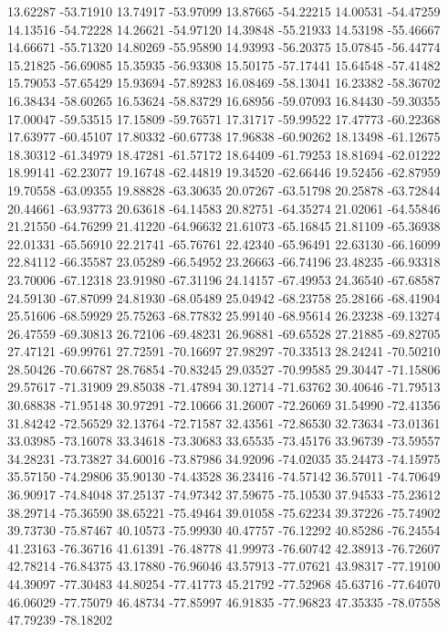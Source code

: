 {13.62287 -53.71910
13.74917 -53.97099
13.87665 -54.22215
14.00531 -54.47259
14.13516 -54.72228
14.26621 -54.97120
14.39848 -55.21933
14.53198 -55.46667
14.66671 -55.71320
14.80269 -55.95890
14.93993 -56.20375
15.07845 -56.44774
15.21825 -56.69085
15.35935 -56.93308
15.50175 -57.17441
15.64548 -57.41482
15.79053 -57.65429
15.93694 -57.89283
16.08469 -58.13041
16.23382 -58.36702
16.38434 -58.60265
16.53624 -58.83729
16.68956 -59.07093
16.84430 -59.30355
17.00047 -59.53515
17.15809 -59.76571
17.31717 -59.99522
17.47773 -60.22368
17.63977 -60.45107
17.80332 -60.67738
17.96838 -60.90262
18.13498 -61.12675
18.30312 -61.34979
18.47281 -61.57172
18.64409 -61.79253
18.81694 -62.01222
18.99141 -62.23077
19.16748 -62.44819
19.34520 -62.66446
19.52456 -62.87959
19.70558 -63.09355
19.88828 -63.30635
20.07267 -63.51798
20.25878 -63.72844
20.44661 -63.93773
20.63618 -64.14583
20.82751 -64.35274
21.02061 -64.55846
21.21550 -64.76299
21.41220 -64.96632
21.61073 -65.16845
21.81109 -65.36938
22.01331 -65.56910
22.21741 -65.76761
22.42340 -65.96491
22.63130 -66.16099
22.84112 -66.35587
23.05289 -66.54952
23.26663 -66.74196
23.48235 -66.93318
23.70006 -67.12318
23.91980 -67.31196
24.14157 -67.49953
24.36540 -67.68587
24.59130 -67.87099
24.81930 -68.05489
25.04942 -68.23758
25.28166 -68.41904
25.51606 -68.59929
25.75263 -68.77832
25.99140 -68.95614
26.23238 -69.13274
26.47559 -69.30813
26.72106 -69.48231
26.96881 -69.65528
27.21885 -69.82705
27.47121 -69.99761
27.72591 -70.16697
27.98297 -70.33513
28.24241 -70.50210
28.50426 -70.66787
28.76854 -70.83245
29.03527 -70.99585
29.30447 -71.15806
29.57617 -71.31909
29.85038 -71.47894
30.12714 -71.63762
30.40646 -71.79513
30.68838 -71.95148
30.97291 -72.10666
31.26007 -72.26069
31.54990 -72.41356
31.84242 -72.56529
32.13764 -72.71587
32.43561 -72.86530
32.73634 -73.01361
33.03985 -73.16078
33.34618 -73.30683
33.65535 -73.45176
33.96739 -73.59557
34.28231 -73.73827
34.60016 -73.87986
34.92096 -74.02035
35.24473 -74.15975
35.57150 -74.29806
35.90130 -74.43528
36.23416 -74.57142
36.57011 -74.70649
36.90917 -74.84048
37.25137 -74.97342
37.59675 -75.10530
37.94533 -75.23612
38.29714 -75.36590
38.65221 -75.49464
39.01058 -75.62234
39.37226 -75.74902
39.73730 -75.87467
40.10573 -75.99930
40.47757 -76.12292
40.85286 -76.24554
41.23163 -76.36716
41.61391 -76.48778
41.99973 -76.60742
42.38913 -76.72607
42.78214 -76.84375
43.17880 -76.96046
43.57913 -77.07621
43.98317 -77.19100
44.39097 -77.30483
44.80254 -77.41773
45.21792 -77.52968
45.63716 -77.64070
46.06029 -77.75079
46.48734 -77.85997
46.91835 -77.96823
47.35335 -78.07558
47.79239 -78.18202
}
